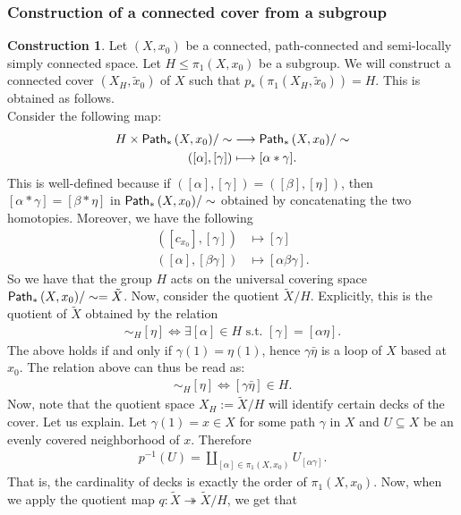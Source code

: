 \documentclass[letterpaper,11pt,twoside]{article}
\theoremstyle{definition}
\theoremstyle{definition}
\theoremstyle{definition}
\theoremstyle{definition}
\theoremstyle{definition}
\theoremstyle{definition}
\newtheorem{construct}[proposition]{\textbf{Construction}}
\theoremstyle{remark}
\theoremstyle{definition}
\newcommand{\pps}[1]{{\fontfamily{lmss}\selectfont 
		\text{Path}_{*}\left(#1\right)
}}
\begin{document}
\subsubsection{Construction of a connected cover from a subgroup}
\begin{construct}
	Let $ (X,x_0) $ be a connected, path-connected and semi-locally simply connected space. Let $ H\le \pi_1(X,x_0) $ be a subgroup. We will construct a connected cover $ (X_H,\tilde{x}_0) $ of $ X $ such that $ p_{*}(\pi_1(X_H,\tilde{x}_0)) = H $. This is obtained as follows.\\
	
	Consider the following map:
	\begin{align*}
		H \times \pps{X,x_0}/\sim  &\longrightarrow \pps{X,x_0}/\sim\\
		([\alpha],[\gamma]) &\longmapsto [\alpha*\gamma].
	\end{align*}
	This is well-defined because if $ ([\alpha],[\gamma]) = ([\beta],[\eta]) $, then $ [\alpha*\gamma] = [\beta*\eta] $ in $ \pps{X,x_0}/\sim $ obtained by concatenating the two homotopies. Moreover, we have the following
	\begin{align*}
		([c_{x_0}],[\gamma]) &\mapsto [\gamma]\\
		([\alpha],[\beta\gamma]) &\mapsto [\alpha\beta\gamma]. 
	\end{align*}
	So we have that the group $ H $ acts on the universal covering space $ \pps{X,x_0}/\sim = \tilde{X}$. Now, consider the quotient $ \tilde{X}/H $. Explicitly, this is the quotient of $ \tilde{X} $ obtained by the relation
	\begin{align*}
		[\gamma] \sim_H [\eta] \iff \exists [\alpha] \in H \text{ s.t. }[\gamma] = [\alpha\eta].
	\end{align*} 
	The above holds if and only if $ \gamma(1) =\eta(1) $, hence $ \gamma\bar{\eta} $ is a loop of $ X $ based at $ x_0 $. The relation above can thus be read as: 
	\begin{align*}
			[\gamma] \sim_H [\eta] \iff [\gamma\bar{\eta}] \in H.
	\end{align*}
	Now, note that the quotient space $ X_H := \tilde{X}/H $ will identify certain decks of the cover. Let us explain. Let $ \gamma(1) = x\in X $ for some path $ \gamma $ in $ X $ and $ U\subseteq X $ be an evenly covered neighborhood of $ x $. Therefore
	\begin{align*}
		p^{-1}(U) = \coprod_{ [\alpha] \in \pi_1(X,x_0) } U_{[\alpha\gamma]}.
	\end{align*}
	That is, the cardinality of decks is exactly the order of $ \pi_1(X,x_0) $. Now, when we apply the quotient map $ q : \tilde{X} \twoheadrightarrow \tilde{X}/H $, we get that 

\end{construct}
\end{document}

